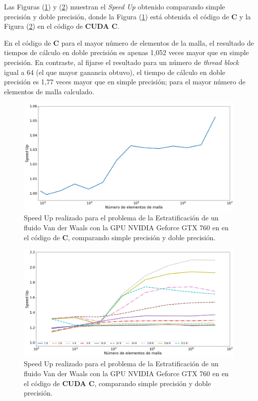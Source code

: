 \newpage

Las Figuras (\ref{fig:c_760_VdW_c_10}) y (\ref{fig:c_760_VdW_cuda_10}) muestran el \textit{Speed Up} obtenido comparando simple precisión y doble precisión, donde la Figura (\ref{fig:c_760_VdW_c_10}) está obtenida el código de \textbf{C} y la Figura (\ref{fig:c_760_VdW_cuda_10}) en el código de \textbf{CUDA C}. 

En el código de \textbf{C} para el mayor número de elementos de la malla, el resultado de tiempos de cálculo en doble precisión es apenas 1,052 veces mayor que en  simple precisión. En contraste, al fijarse el resultado para un número de \textit{thread block} igual a 64 (el que mayor ganancia obtuvo), el tiempo de cálculo en doble precisión es 1,77 veces mayor que en simple precisión; para el mayor número de elementos de malla calculado.

\begin{figure}[h!]
	\centering
	\includegraphics[width=\textwidth]{figs/cap4/c_760_VdW_c_10}
	\caption{Speed Up realizado para el problema de la Estratificación de un fluido Van der Waals con la GPU NVIDIA Geforce GTX 760 en en el código de \textbf{C}, comparando simple precisión y doble precisión.} 
	\label{fig:c_760_VdW_c_10}	
\end{figure}

\begin{figure}[h!]
	\centering
	\includegraphics[width=\textwidth]{figs/cap4/c_760_MxC_cuda_10}
	\caption{Speed Up realizado para el problema de la Estratificación de un fluido Van der Waals con la GPU NVIDIA Geforce GTX 760 en en el código de \textbf{CUDA C}, comparando simple precisión y doble precisión.} 
	\label{fig:c_760_VdW_cuda_10}	
\end{figure}

